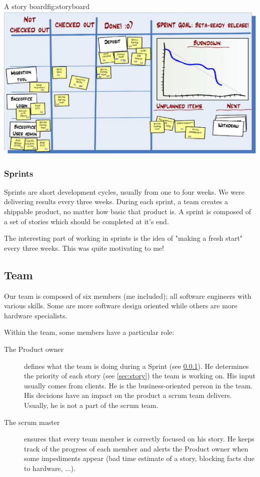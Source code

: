 \begin{figureGraphics}{A story board}{fig:storyboard}
    \includegraphics[width=\textwidth]{./src/img/taskboard.jpg}
\end{figureGraphics}


\subsubsection{Sprints}\label{sec:sprint}
Sprints are short development cycles, usually from one to four weeks. We were
delivering results every three weeks. During each sprint, a team creates a
shippable product, no matter how basic that product is. A sprint is composed of
a set of stories which should be completed at it's end.

The interesting part of working in sprints is the idea of "making a fresh start" every three weeks. This
was quite motivating to me!


\subsection{Team}
Our team is composed of six members (me included); all software engineers with various
skills. Some are more software design oriented while others are more hardware
specialists.

Within the team, some members have a particular role:
\begin{description}
    \item[The Product owner]
        defines what the team is doing during a Sprint (see \ref{sec:sprint}).
        He determines the priority of each story (see \ref{sec:story}) the
        team is working on. His input usually comes from clients. He is the
        business-oriented person in the team. His decisions have an impact on
        the product a \gls{scrum} team delivers. Usually, he is not
        a part of the \gls{scrum} team.
    \item[The scrum master]
        ensures that every team member is correctly focused on his story. He
        keeps track of the progress of each member and alerts the
        Product owner when some impediments appear (bad time estimate of a
        story, blocking facts due to hardware, ...).
\end{description}

